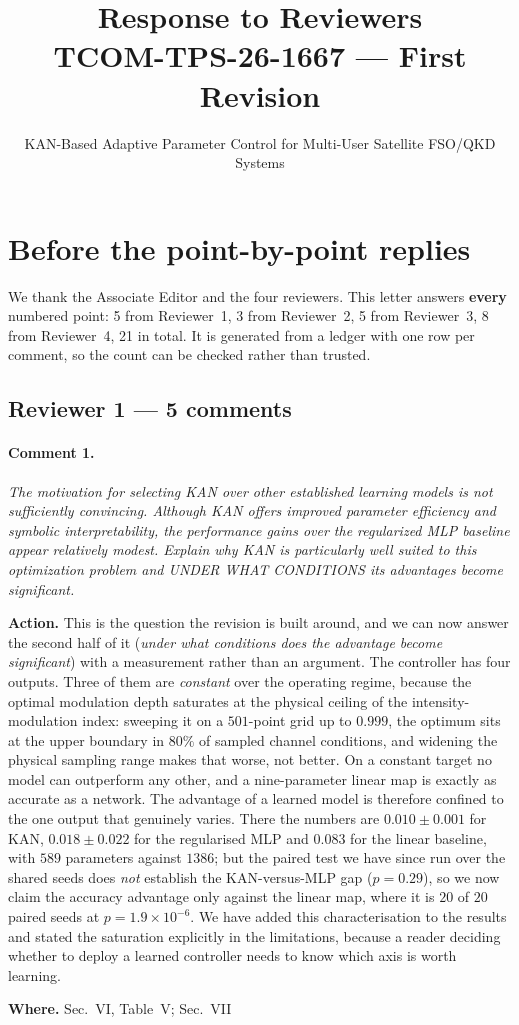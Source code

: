 \documentclass[10pt]{article}
\title{Response to Reviewers\\ \large TCOM-TPS-26-1667 --- First Revision}
\author{\normalsize KAN-Based Adaptive Parameter Control for Multi-User Satellite FSO/QKD Systems}
\date{}
\newcommand{\rev}[1]{\par\medskip\noindent\textit{#1}\par\smallskip}
\newcommand{\act}[2]{\noindent\textbf{Action.} #1\par\noindent\textbf{Where.} #2\par}
\begin{document}
\maketitle

\section*{Before the point-by-point replies}

We thank the Associate Editor and the four reviewers. This letter answers \textbf{every} numbered point: 5 from Reviewer~1, 3 from Reviewer~2, 5 from Reviewer~3, 8 from Reviewer~4, 21 in total. It is generated from a ledger with one row per comment, so the count can be checked rather than trusted.

\subsection*{Reviewer 1 --- 5 comments}

\paragraph{Comment 1.}
\rev{The motivation for selecting KAN over other established learning models is not sufficiently convincing. Although KAN offers improved parameter efficiency and symbolic interpretability, the performance gains over the regularized MLP baseline appear relatively modest. Explain why KAN is particularly well suited to this optimization problem and UNDER WHAT CONDITIONS its advantages become significant.}
\act{This is the question the revision is built around, and we can now answer the second half of it (\emph{under what conditions does the advantage become significant}) with a measurement rather than an argument. The controller has four outputs. Three of them are \emph{constant} over the operating regime, because the optimal modulation depth saturates at the physical ceiling of the intensity-modulation index: sweeping it on a $501$-point grid up to $0.999$, the optimum sits at the upper boundary in $80\%$ of sampled channel conditions, and widening the physical sampling range makes that worse, not better. On a constant target no model can outperform any other, and a nine-parameter linear map is exactly as accurate as a network. The advantage of a learned model is therefore confined to the one output that genuinely varies. There the numbers are $0.010 \pm 0.001$ for KAN, $0.018 \pm 0.022$ for the regularised MLP and $0.083$ for the linear baseline, with $589$ parameters against $1386$; but the paired test we have since run over the shared seeds does \emph{not} establish the KAN-versus-MLP gap ($p=0.29$), so we now claim the accuracy advantage only against the linear map, where it is $20$ of $20$ paired seeds at $p=1.9\times10^{-6}$. We have added this characterisation to the results and stated the saturation explicitly in the limitations, because a reader deciding whether to deploy a learned controller needs to know which axis is worth learning.}{Sec.~VI, Table~V; Sec.~VII}
\end{document}
